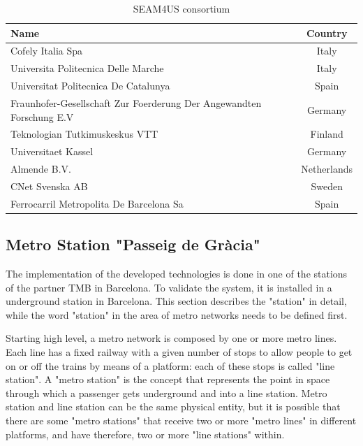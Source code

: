 \begin{table}[htbp]
  \centering
  
    \begin{tabularx}{\columnwidth}{|X|c|}
	\hline
    \textbf{Name} & \textbf{Country} \\
	\hline
    Cofely Italia Spa & Italy \\
	\hline
    Universita Politecnica Delle Marche & Italy \\
	\hline
    Universitat Politecnica De Catalunya & Spain \\
	\hline
    Fraunhofer-Gesellschaft Zur Foerderung Der Angewandten Forschung E.V & Germany \\
	\hline
    Teknologian Tutkimuskeskus VTT & Finland \\
	\hline
    Universitaet Kassel & Germany \\
	\hline
    Almende B.V. & Netherlands \\
    	\hline
    CNet Svenska AB & Sweden \\
    	\hline
    	Ferrocarril Metropolita De Barcelona Sa & Spain \\
	\hline
    \end{tabularx}%
    
  \caption{SEAM4US consortium}%
  \label{tab:SEAM4USconsortium}%
\end{table}%


\subsection{Metro Station "Passeig de Gr\`{a}cia"}
\label{subsec:station}


The implementation of the developed technologies is done in one of the stations of the partner TMB in Barcelona.
To validate the system, it is installed in a underground station in Barcelona.
This section describes the "station" in detail, while the word "station" in the area of metro networks needs to be defined first.

Starting high level, a metro network is composed by one or more metro lines. Each line has a fixed railway with a given number of stops to allow people to get on or off the trains by means of a platform: each of these stops is called "line station". A "metro station" is the concept that represents the point in space through which a passenger gets underground and into a line station. Metro station and line station can be the same physical entity, but it is possible that there are some "metro stations" that receive two or more "metro lines" in different platforms, and have therefore, two or more "line stations" within.

